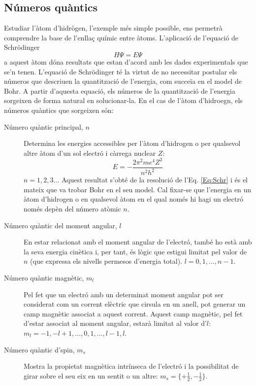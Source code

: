 \subsection{Números quàntics}
Estudiar l'àtom d'hidrògen, l'exemple més simple possible, ens permetrà comprendre la base de l'enllaç químic entre àtoms.
L'aplicació de l'equació de Schrödinger 
\begin{equation}
H\Psi = E\Psi
\label{Eq:Schr}
\end{equation}a aquest àtom dóna resultats que estan d'acord amb les dades experimentals que se'n tenen.
L'equació de Schrödinger té la virtut de no necessitar postular els números que descriuen la quantització de l'energia, com succeïa en el model de Bohr. A partir d'aquesta equació, els números de la quantització de l'energia sorgeixen de forma natural en solucionar-la. En el cas de l'àtom d'hidroegn, els números quàntics que sorgeixen són:
\begin{description}
\item[Número quàntic principal, $n$]  Determina les energies accessibles per l'àtom d'hidrogen o per qualsevol altre àtom d'un sol electró i càrrega nuclear $Z$:
\[
E=-\frac{2\pi^2 me^4 Z^2}{n^2 h^2}
\]
$n=1,2,3\ldots$
Aquest resultat s'obté de la resolució de l'Eq. \ref{Eq:Schr} i és el mateix que va trobar Bohr en el seu model.
Cal fixar-se que l'energia en un àtom d'hidrogen o en qualsevol àtom en el qual només hi hagi un electró només depèn del número atòmic $n$.
\item[Número quàntic del moment angular, $l$] En estar relacionat amb el moment angular de l'electró, també ho està amb la seva energia cinètica i, per tant, és lògic que estigui limitat pel valor de $n$ (que expressa els nivells permesos d'energia total). $l=0, 1, \ldots, n-1$.
\item[Número quàntic magnètic, $m_l$] Pel fet que un electró amb un determinat moment angular pot ser considerat com un corrent elèctric que cirsula en un anell, pot generar un camp magnètic associat a aquest corrent. Aquest camp magnètic, pel fet d'estar associat al moment angular, estarà limitat al valor d'$l$: $m_l=-1, -l+1, \ldots, 0, 1, \ldots, l-1,l$.
\item[Número quàntic d'spin, $m_s$] Mostra la propietat magnètica intrínseca de l'electró i la possibilitat de girar sobre el seu eix en un sentit o un altre: $m_s=\{+\frac{1}{2},-\frac{1}{2}\}$.
\end{description}


